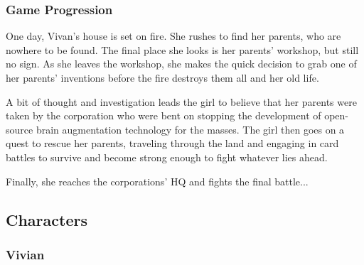 \documentclass[12pt,titlepage]{article}
\begin{document}
\subsubsection{Game Progression}

One day, Vivan's house is set on fire. She rushes to find her parents, who are
nowhere to be found. The final place she looks is her parents' workshop, but
still no sign. As she leaves the workshop, she makes the quick decision to grab
one of her parents' inventions before the fire destroys them all and her old
life.

A bit of thought and investigation leads the girl to believe that her parents
were taken by the corporation who were bent on stopping the development of
open-source brain augmentation technology for the masses. The girl then goes on
a quest to rescue her parents, traveling through the land and engaging in card
battles to survive and become strong enough to fight whatever lies ahead.

Finally, she reaches the corporations' HQ and fights the final battle...






\subsection{Characters}

\subsubsection{Vivian}
\end{document}
